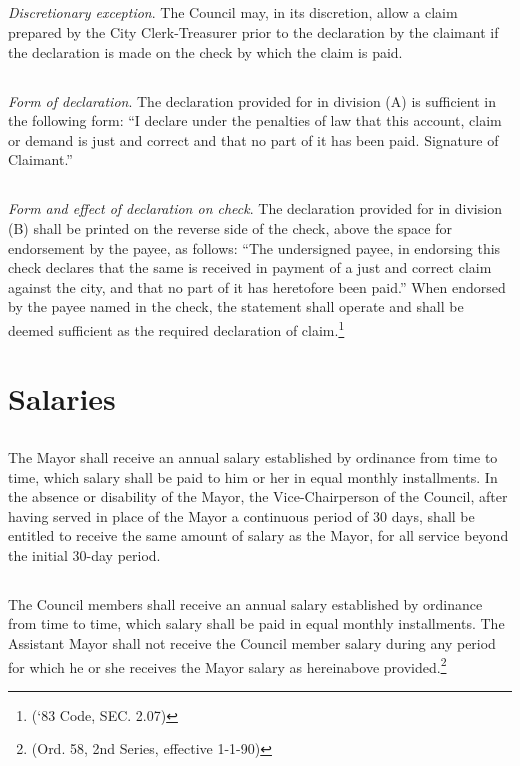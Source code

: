 \subsection{}
\emph{Discretionary exception}. The Council may, in its discretion, allow a claim prepared by the City Clerk-Treasurer prior to the declaration by the claimant if the declaration is made on the check by which the claim is paid.
\subsection{}
\emph{Form of declaration}. The declaration provided for in division (A) is sufficient in the following form: “I declare under the penalties of law that this account, claim or demand is just and correct and that no part of it has been paid. Signature of Claimant.”
\subsection{}
\emph{Form and effect of declaration on check}. The declaration provided for in division (B) shall be printed on the reverse side of the check, above the space for endorsement by the payee, as follows: “The undersigned payee, in endorsing this check declares that the same is received in payment of a just and correct claim against the city, and that no part of it has heretofore been paid.” When endorsed by the payee named in the check, the statement shall operate and shall be deemed sufficient as the required declaration of claim.\footnote{(‘83 Code, SEC. 2.07)}



\section{Salaries}
\subsection{}
The Mayor shall receive an annual salary established by ordinance from time to time, which salary shall be paid to him or her in equal monthly installments.  In the absence or disability of the Mayor, the Vice-Chairperson of the Council, after having served in place of the Mayor a continuous period of 30 days, shall be entitled to receive the same amount of salary as the Mayor, for all service beyond the initial 30-day period.
\subsection{}
The Council members shall receive an annual salary established by ordinance from time to time, which salary shall be paid in equal monthly installments.  The Assistant Mayor shall not receive the Council member salary during any period for which he or she receives the Mayor salary as hereinabove provided.\footnote{(Ord. 58, 2nd Series, effective 1-1-90)}
